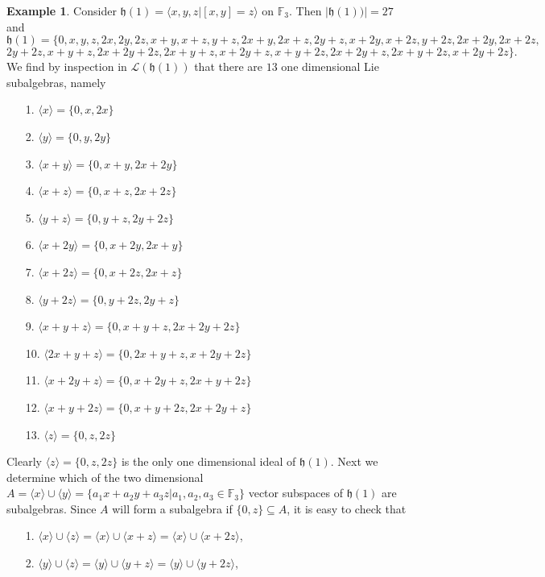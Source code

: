 \documentclass{amsart}
\theoremstyle{definition}
\newtheorem{example}[theorem]{Example}
\numberwithin{equation}{section}
\begin{document}
\begin{example} \label{exam3} Consider $\mathfrak{h}(1)=
\langle x,y,z|[x,y]=z\rangle $ on \(\mathbb{F}_{3}\). Then  $|\mathfrak{h}(1))|=27 $ and
$$\mathfrak{h}(1)=\{0,x,y,z,
2x,2y,2z, 
x+y, x+z, y+z,
2x+y, 2x+z, 2y+z,
x+2y, x+2z, y+2z, 
2x+2y, 2x+2z, $$
$$ 2y+2z,
x+y+z, 2x+2y+2z,
2x+y+z, x+2y+z, x+y+2z,
2x+2y+z, 2x+y+2z, x+2y+2z
\}.$$
We find by inspection in $\mathcal{L}(\mathfrak{h}(1))$ that there are $13$ one dimensional Lie subalgebras, namely 
\begin{multicols}{2}
\begin{itemize}
\item [1.] $\langle x \rangle=\{0, x,2x\}$
\item [2.] $\langle y \rangle=\{0, y, 2y\}$
\item [3.]   $\langle x+y \rangle=\{0, x+y,2x+2y\}$
\item [4.] $\langle x+z \rangle=\{0, x+z,2x+2z\}$
\item [5.] $\langle y+z \rangle=\{0, y+z,2y+2z\}$
\item [6.] $\langle x+2y \rangle=\{0, x+2y,2x+y\}$
\item [7.] $\langle x+2z \rangle=\{0, x+2z,2x+z\}$
\item [8.] $\langle y+2z \rangle=\{0, y+2z,2y+z\}$
\item [9.] $\langle x+y+z \rangle=\{0, x+y+z,2x+2y+2z\}$
\item [10.] $\langle 2x+y+z \rangle=\{0, 2x+y+z,x+2y+2z\}$
\item [11.] $\langle x+2y+z \rangle=\{0, x+2y+z,2x+y+2z\}$
    \item [12.] $\langle x+y+2z \rangle=\{0, x+y+2z,2x+2y+z\}$
    \item [13.] $\langle z \rangle= \{0, z,2z\}$
\end{itemize} 
\end{multicols}
Clearly $\langle z \rangle= \{0, z,2z\}$ is the only  one dimensional ideal of $\mathfrak{h}(1)$. Next we determine which of the two dimensional $A=\langle x \rangle \cup  \langle y \rangle=\{a_1x+a_2y+a_3z| a_1,a_2, a_3\in \mathbb{F}_{3}\}$ vector subspaces of $\mathfrak{h}(1)$ are subalgebras. Since $A$ will form a subalgebra if $\{0,z\} \subseteq A$,   it is easy to check that  
\begin{itemize}
\item [1.] $\langle x \rangle\cup \langle z \rangle= \langle x \rangle\cup \langle x+z \rangle=
\langle x \rangle\cup \langle x+2z \rangle$, 

\item [2.] $\langle y \rangle\cup \langle z \rangle= \langle y \rangle\cup \langle y+z \rangle=
\langle y \rangle\cup \langle y+2z \rangle$, 


\end{itemize}
\end{example}
\end{document}

